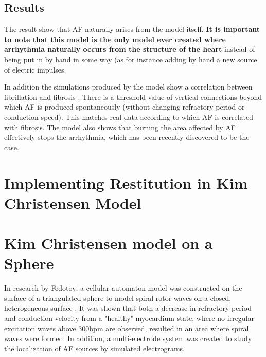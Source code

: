 \documentclass[twocolumn, a1paper, 20pt]{article}
\begin{document}
\subsection{Results}

The result show that AF naturally arises from the model itself.
\textbf{ It is important to note that this model is the only model ever created where arrhythmia naturally occurs from the structure of the heart} instead of being put in by hand in some way (as for instance adding by hand a new source of electric impulses. 
 



 In addition the simulations produced by the model show a correlation between fibrillation and fibrosis .
There is a threshold value of vertical connections beyond which AF is produced spontaneously (without changing refractory period or conduction speed). This matches real data according to which AF is correlated with fibrosis. 
The model also shows that burning the area affected by AF effectively stops the arrhythmia, which has been recently discovered to be the case. 








\section{\textbf{Implementing Restitution in Kim Christensen Model}} 




\section{\textbf{Kim Christensen model on a Sphere}}



In research by Fedotov, a cellular automaton model was constructed on the surface of a triangulated sphere to model spiral rotor waves on a closed, heterogeneous surface \cite{Fedotov}. It was shown that both a decrease in refractory period and conduction velocity from a "healthy" myocardium state, where no irregular excitation waves above 300bpm are observed, resulted in an area where spiral waves were formed. In addition, a multi-electrode system was created to study the localization of AF sources by simulated electrograms. 
\end{document}
